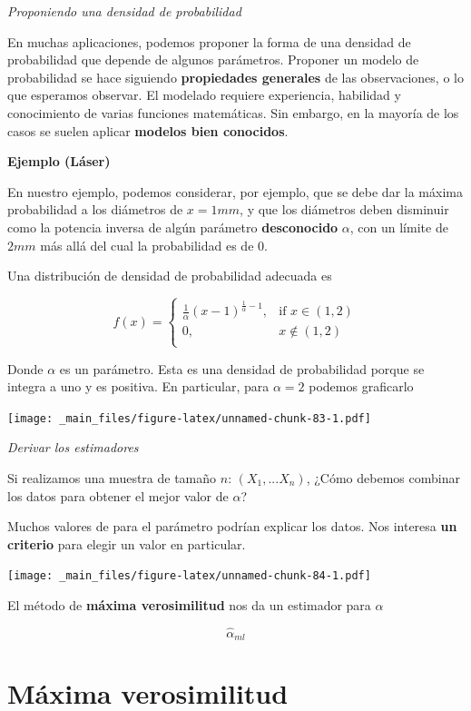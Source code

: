 \documentclass[
]{book}
\begin{document}
\emph{Proponiendo una densidad de probabilidad}

En muchas aplicaciones, podemos proponer la forma de una densidad de probabilidad que depende de algunos parámetros. Proponer un modelo de probabilidad se hace siguiendo \textbf{propiedades generales} de las observaciones, o lo que esperamos observar. El modelado requiere experiencia, habilidad y conocimiento de varias funciones matemáticas. Sin embargo, en la mayoría de los casos se suelen aplicar \textbf{modelos bien conocidos}.

\textbf{Ejemplo (Láser)}

En nuestro ejemplo, podemos considerar, por ejemplo, que se debe dar la máxima probabilidad a los diámetros de \(x=1 mm\), y que los diámetros deben disminuir como la potencia inversa de algún parámetro \textbf{desconocido} \(\alpha\), con un límite de \(2mm\) más allá del cual la probabilidad es de \(0\).

Una distribución de densidad de probabilidad adecuada es

\[
    f(x)= 
\begin{cases}
\frac{1}{\alpha}(x-1)^{\frac{1}{\alpha}-1},& \text{if } x \in (1,2)\\
    0,& x \notin (1,2)\\
\end{cases}
\]

Donde \(\alpha\) es un parámetro. Esta es una densidad de probabilidad porque se integra a uno y es positiva. En particular, para \(\alpha=2\) podemos graficarlo

\texttt{[image: \_main\_files/figure-latex/unnamed-chunk-83-1.pdf]}

\emph{Derivar los estimadores}

Si realizamos una muestra de tamaño \(n\): \((X_1,...X_n)\), ¿Cómo debemos combinar los datos para obtener el mejor valor de \(\alpha\)?

Muchos valores de para el parámetro podrían explicar los datos. Nos interesa \textbf{un criterio} para elegir un valor en particular.

\texttt{[image: \_main\_files/figure-latex/unnamed-chunk-84-1.pdf]}

El método de \textbf{máxima verosimilitud} nos da un estimador para \(\alpha\)

\[\hat{\alpha}_{ml}\]

\hypertarget{muxe1xima-verosimilitud-1}{%
\section{Máxima verosimilitud}\label{muxe1xima-verosimilitud-1}}
\end{document}
